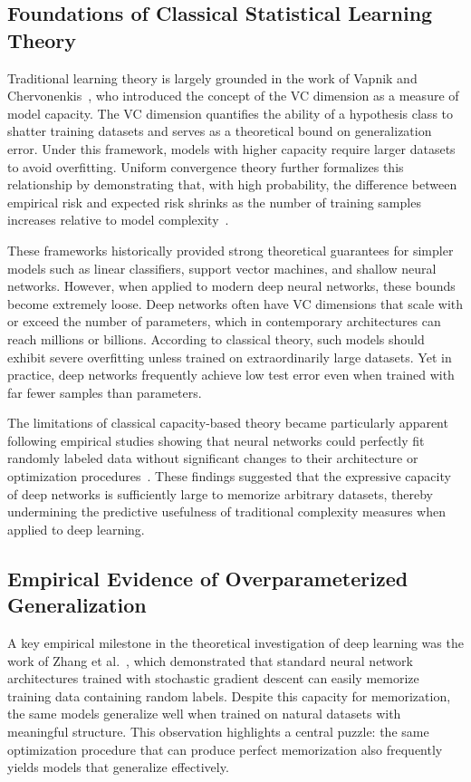\documentclass[conference]{IEEEtran}
\begin{document}
\subsection{Foundations of Classical Statistical Learning Theory}

Traditional learning theory is largely grounded in the work of Vapnik and Chervonenkis~\cite{vapnik1971uniform}, who introduced the concept of the VC dimension as a measure of model capacity. The VC dimension quantifies the ability of a hypothesis class to shatter training datasets and serves as a theoretical bound on generalization error. Under this framework, models with higher capacity require larger datasets to avoid overfitting. Uniform convergence theory further formalizes this relationship by demonstrating that, with high probability, the difference between empirical risk and expected risk shrinks as the number of training samples increases relative to model complexity~\cite{vapnik1998statistical}.

These frameworks historically provided strong theoretical guarantees for simpler models such as linear classifiers, support vector machines, and shallow neural networks. However, when applied to modern deep neural networks, these bounds become extremely loose. Deep networks often have VC dimensions that scale with or exceed the number of parameters, which in contemporary architectures can reach millions or billions. According to classical theory, such models should exhibit severe overfitting unless trained on extraordinarily large datasets. Yet in practice, deep networks frequently achieve low test error even when trained with far fewer samples than parameters.

The limitations of classical capacity-based theory became particularly apparent following empirical studies showing that neural networks could perfectly fit randomly labeled data without significant changes to their architecture or optimization procedures~\cite{zhang2017understanding}. These findings suggested that the expressive capacity of deep networks is sufficiently large to memorize arbitrary datasets, thereby undermining the predictive usefulness of traditional complexity measures when applied to deep learning.

\subsection{Empirical Evidence of Overparameterized Generalization}

A key empirical milestone in the theoretical investigation of deep learning was the work of Zhang et al.~\cite{zhang2017understanding}, which demonstrated that standard neural network architectures trained with stochastic gradient descent can easily memorize training data containing random labels. Despite this capacity for memorization, the same models generalize well when trained on natural datasets with meaningful structure. This observation highlights a central puzzle: the same optimization procedure that can produce perfect memorization also frequently yields models that generalize effectively.
\end{document}
